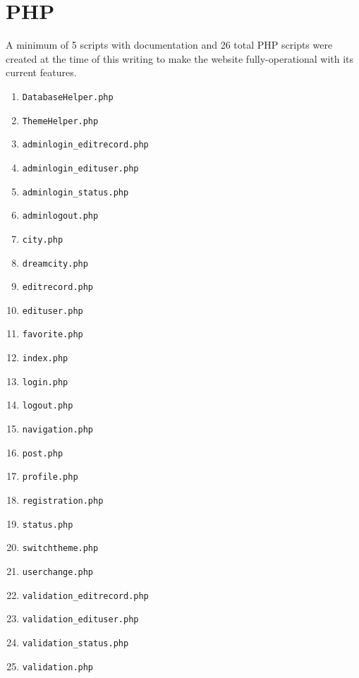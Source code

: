 \documentclass[12pt, letterpaper]{article}
\begin{document}
 \newpage

\section{PHP}

A minimum of 5 scripts with documentation and 26 total PHP scripts were created at the time of this writing to make the website fully-operational with its current features.
\begin{enumerate}
	\item \lstinline{DatabaseHelper.php}
	\item \lstinline{ThemeHelper.php}
	\item \lstinline{adminlogin_editrecord.php}
	\item \lstinline{adminlogin_edituser.php}
	\item \lstinline{adminlogin_status.php}
	\item \lstinline{adminlogout.php}
	\item \lstinline{city.php}
	\item \lstinline{dreamcity.php}
	\item \lstinline{editrecord.php}
	\item \lstinline{edituser.php}
	\item \lstinline{favorite.php}
	\item \lstinline{index.php}
	\item \lstinline{login.php}
	\item \lstinline{logout.php}
	\item \lstinline{navigation.php}
	\item \lstinline{post.php}
	\item \lstinline{profile.php}
	\item \lstinline{registration.php}
	\item \lstinline{status.php}
	\item \lstinline{switchtheme.php}
	\item \lstinline{userchange.php}
	\item \lstinline{validation_editrecord.php}
	\item \lstinline{validation_edituser.php}
	\item \lstinline{validation_status.php}
	\item \lstinline{validation.php}
\end{enumerate}
\end{document}
